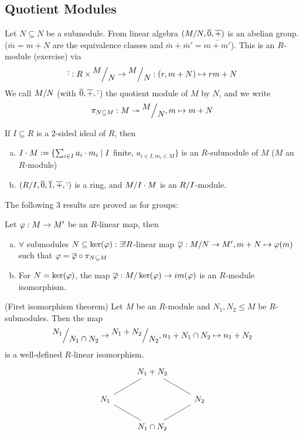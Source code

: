 \documentclass[a4paper]{report}
\begin{document}
\subsection*{Quotient Modules}
\begin{defi}
  Let $N \subseteq N$ be a submodule. From linear algebra $(\fak MN, \bar 0, \bar +)$ is an abelian group. ($\bar m = m + N$ are the equivalence classes and $\bar m + \bar m' = \bar{m+m'}$). This is an $R$-module (exercise) via \[\bar \cd : R \tm \fak MN \to \fak MN: (r, m+N) \mps rm + N\]
  We call $\fak MN$ (with $\overline 0, \overline +, \overline {\cdot}$) the quotient module of $M$ by $N$, and we write \[\pi_{N \subseteq M}: M \twoheadrightarrow \fak MN, m \mps m+N\]
\end{defi}
\begin{defi}
  If $I \subseteq R$ is a 2-sided ideal of $R$, then
  \begin{enumerate}[(a)]
    \item $I \cdot M := \{\sum_{i \in I} a_{i} \cdot m_{i} \mid I$ finite, $a_{i \in I, m_{i} \in M}\}$ is an $R$-submodule of $M$ ($M$ an $R$-module)
          \item $(\fak RI, \bar 0, \bar 1, \bar +, \bar \cd)$ is a ring, and $\fak M{I \cd M}$ is an $\fak RI$-module.
  \end{enumerate}
\end{defi}
The following 3 results are proved as for groups:
\begin{thm}
  Let $\varphi: M \to M'$ be an $R$-linear map, then
  \begin{enumerate}[(a)]
    \item $\forall$ submodules $N \subseteq \ker(\varphi): \exists ! R$-linear map $\bar \ph : \fak MN \to M', m+N \mps \ph(m)$ such that $\varphi = \overline {\varphi} \circ \pi_{N \subseteq M}$
          \item For $N = \ker(\varphi)$, the map $\bar \ph : \fak M{\ker(\ph)} \to im(\ph)$ is an $R$-module isomorphism.
  \end{enumerate}
\end{thm}
\begin{thm}(First isomorphism theorem)
  Let $M$ be an $R$-module and $N_{1}, N_{2} \le M$ be $R$-submodules. Then the map \[\fak {N_{1}}{N_{1} \cap N_{2}} \to \fak {N_{1} + N_{2}}{N_{2}}, n_{1} + N_{1} \cap N_{2} \mps n_{1} + N_{2}\]
  is a well-defined $R$-linear isomorphism.
  \[\begin{tikzcd}
                        & N_1+N_2 \arrow[ld, no head]      &                         \\
N_1 \arrow[rd, no head] &                                  & N_2 \arrow[lu, no head] \\
                        & N_1 \cap N_2 \arrow[ru, no head] &
\end{tikzcd}\]
\end{thm}
\end{document}

